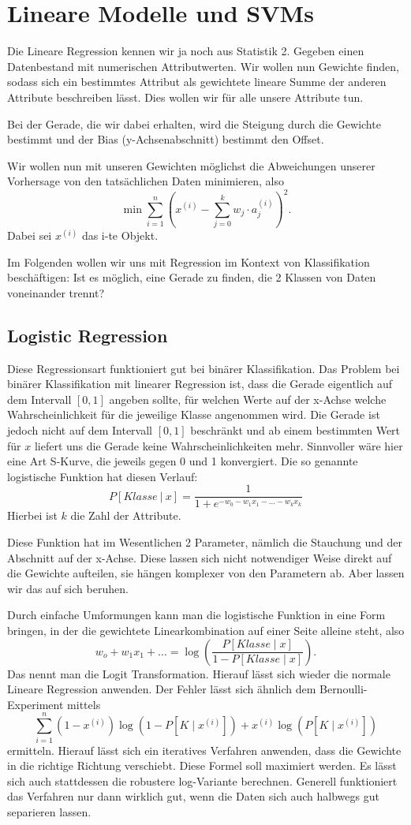 \section{Lineare Modelle und SVMs}
Die Lineare Regression kennen wir ja noch aus Statistik 2.
Gegeben einen Datenbestand mit numerischen Attributwerten.
Wir wollen nun Gewichte finden, sodass sich ein bestimmtes Attribut
als gewichtete lineare Summe der anderen Attribute beschreiben lässt.
Dies wollen wir für alle unsere Attribute tun.

Bei der Gerade, die wir dabei erhalten, wird die Steigung durch
die Gewichte bestimmt und der Bias (y-Achsenabschnitt) bestimmt
den Offset.  

Wir wollen nun mit unseren Gewichten möglichst die Abweichungen
unserer Vorhersage von den tatsächlichen Daten minimieren, also
\[ \min \sum_{i=1}^{n}\left( x^{(i)} - 
\sum_{j=0}^k w_j \cdot a_j^{(i)}\right)^2 .\]
Dabei sei \(x^{(i)}\) das i-te Objekt.

Im Folgenden wollen wir uns mit Regression im Kontext von
Klassifikation beschäftigen: Ist es möglich, eine Gerade zu finden,
die 2 Klassen von Daten voneinander trennt?

\subsection{Logistic Regression}
Diese Regressionsart funktioniert gut bei binärer Klassifikation.
Das Problem bei binärer Klassifikation mit linearer Regression ist,
dass die Gerade eigentlich auf dem Intervall \([0,1]\) angeben sollte,
für welchen Werte auf der x-Achse welche Wahrscheinlichkeit für
die jeweilige Klasse angenommen wird. Die Gerade ist jedoch nicht auf
dem Intervall \([0,1]\) beschränkt und ab einem bestimmten Wert
für \(x\) liefert uns die Gerade keine Wahrscheinlichkeiten mehr.
Sinnvoller wäre hier eine Art S-Kurve, die jeweils gegen 0 und 1 konvergiert.
Die so genannte logistische Funktion hat diesen Verlauf:
\[P[Klasse\ |\ x]= \frac{1}{1+e^{-w_0 - w_1 x_1 - \dots - w_k x_k}}\]
Hierbei ist \(k\) die Zahl der Attribute.

Diese Funktion hat im Wesentlichen 2 Parameter, nämlich die Stauchung
und der Abschnitt auf der x-Achse. Diese lassen sich nicht notwendiger
Weise direkt auf die Gewichte aufteilen, sie hängen komplexer von 
den Parametern ab. Aber lassen wir das auf sich beruhen.

Durch einfache Umformungen kann man die logistische Funktion in eine
Form bringen, in der  die gewichtete Linearkombination auf einer Seite
alleine steht, also 
\[
w_o + w_1 x_1 + \dots =
\log \left(\frac{P[Klasse \mid x]}{1 - P[Klasse \mid x]}\right).
\]
Das nennt man die Logit Transformation. Hierauf lässt sich wieder die
normale Lineare Regression anwenden. Der Fehler lässt sich ähnlich
dem Bernoulli-Experiment mittels
\[
\sum_{i=1}^n (1-x^{(i)})\log(1-P[K \mid x^{(i)}]) + 
x^{(i)}\log(P[K \mid x^{(i)}])
\]
ermitteln. Hierauf lässt sich ein iteratives Verfahren anwenden, dass die Gewichte
in die richtige Richtung verschiebt. Diese Formel soll maximiert werden.
Es lässt sich auch stattdessen die robustere log-Variante berechnen. 
Generell funktioniert das Verfahren nur dann wirklich gut, wenn die 
Daten sich auch halbwegs gut separieren lassen.


